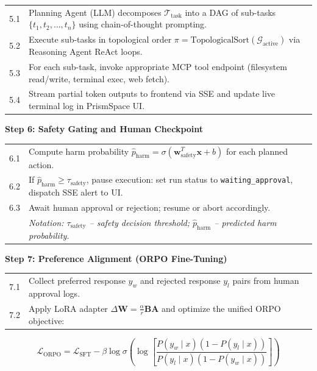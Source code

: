 \documentclass[12pt,a4paper]{report}
\begin{document}
\noindent\begin{tabular}{p{1cm} p{12.5cm}}
5.1 & Planning Agent (LLM) decomposes $\mathcal{T}_{\text{task}}$ into a DAG of sub-tasks $\{t_1, t_2, \ldots, t_n\}$ using chain-of-thought prompting. \\
5.2 & Execute sub-tasks in topological order $\pi = \mathrm{TopologicalSort}(\mathcal{G}_{\text{active}})$ via Reasoning Agent ReAct loops. \\
5.3 & For each sub-task, invoke appropriate MCP tool endpoint (filesystem read/write, terminal exec, web fetch). \\
5.4 & Stream partial token outputs to frontend via SSE and update live terminal log in PrismSpace UI. \\
\end{tabular}

\vspace{8pt}
\noindent\textbf{Step 6: Safety Gating and Human Checkpoint}
\vspace{4pt}

\noindent\begin{tabular}{p{1cm} p{12.5cm}}
6.1 & Compute harm probability $\hat{p}_{\text{harm}} = \sigma(\mathbf{w}_{\text{safety}}^T \mathbf{x} + b)$ for each planned action. \\
6.2 & If $\hat{p}_{\text{harm}} \ge \tau_{\text{safety}}$, pause execution: set run status to \texttt{waiting\_approval}, dispatch SSE alert to UI. \\
6.3 & Await human approval or rejection; resume or abort accordingly. \\
 & \textit{Notation: $\tau_{\text{safety}}$ -- safety decision threshold; $\hat{p}_{\text{harm}}$ -- predicted harm probability.} \\
\end{tabular}

\vspace{8pt}
\noindent\textbf{Step 7: Preference Alignment (ORPO Fine-Tuning)}
\vspace{4pt}

\noindent\begin{tabular}{p{1cm} p{12.5cm}}
7.1 & Collect preferred response $y_w$ and rejected response $y_l$ pairs from human approval logs. \\
7.2 & Apply LoRA adapter $\Delta\mathbf{W} = \frac{\alpha}{r}\mathbf{B}\mathbf{A}$ and optimize the unified ORPO objective: \\
\end{tabular}
\begin{equation}
    \mathcal{L}_{\mathrm{ORPO}} = \mathcal{L}_{\mathrm{SFT}} - \beta \log \sigma \left( \log \left[ \frac{P(y_w \mid x)(1 - P(y_l \mid x))}{P(y_l \mid x)(1 - P(y_w \mid x))} \right] \right)
\end{equation}
\end{document}
